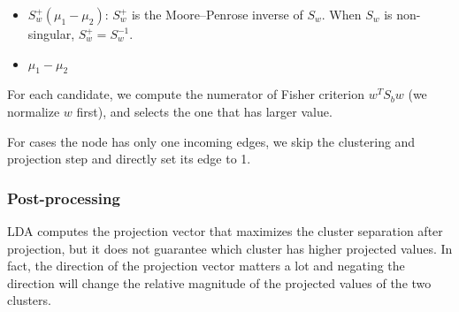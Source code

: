 \begin{itemize}[noitemsep, topsep=1pt, partopsep=1pt, listparindent=\parindent, leftmargin=*]

    \item $S_w^{+}(\mu_1-\mu_2)$: $S_w^{+}$ is the Moore–Penrose inverse of $S_w$. When $S_w$ is non-singular, $S_w^{+} = S_w^{-1}$.

    \item $\mu_1-\mu_2$
\end{itemize}
For each candidate, we compute the numerator of Fisher criterion $w^TS_bw$ (we normalize $w$ first), and selects the one that has larger value.


For cases the node has only one incoming edges, we skip the clustering and projection step and directly set its edge to 1.



\subsubsection{Post-processing}

LDA computes the projection vector that maximizes the cluster separation after projection, but it does not guarantee which cluster has higher projected values. In fact, the direction of the projection vector matters a lot and negating the direction will change the relative magnitude of the projected values of the two clusters.

